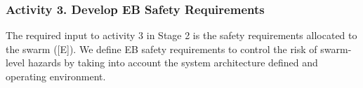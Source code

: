 \documentclass[runningheads]{llncs}
\begin{document}



\vspace{-4ex}
\subsubsection*{Activity 3. Develop EB Safety Requirements}

The required input to activity 3 in Stage 2 is the safety requirements allocated to the swarm ([E]).
We define EB safety requirements to control the risk of swarm-level hazards by taking into account the system architecture defined and operating environment. 

\end{document}
